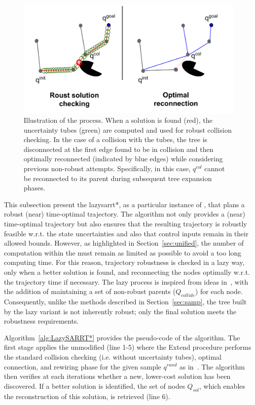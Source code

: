 \begin{figure} [htp]
    \centering
    \includegraphics[width=0.8\linewidth]{figures/samp/lazyrrtstar.png} 
    \caption{Illustration of the  process.
    When a solution is found (red), the uncertainty tubes (green) are computed and used for robust collision checking.
    In the case of a collision with the tubes, the tree is disconnected at the first edge found to be in collision and then optimally reconnected (indicated by blue edges) while considering previous non-robust attempts. 
    Specifically, in this case, $q^{col}$ cannot be reconnected to its parent during subsequent tree expansion phases.
    }%
    \label{fig:lazysarrt*}%
\end{figure}

This subsection present the \gls{lazysarrt*}, as a particular instance of , that plans a robust (near) time-optimal trajectory.
The algorithm not only provides a (near) time-optimal trajectory but also ensures that the resulting trajectory is robustly feasible w.r.t. the state uncertainties and also that control inputs remain in their allowed bounds.
However, as highlighted in Section~\ref{sec:unified}, the number of  computation within the  must remain as limited as possible to avoid a too long computing time. 
For this reason, trajectory robustness is checked in a lazy way, only when a better solution is found, and reconnecting the nodes optimally w.r.t. the trajectory time if necessary.
The lazy process is inspired from ideas in~\cite{cLazy1,cLazy2}, with the addition of maintaining a set of non-robust parents ($Q_{collide}$) for each node.
Consequently, unlike the  methods described in Section~\ref{sec:samp}, the tree built by the lazy variant is not inherently robust; only the final solution meets the robustness requirements.

Algorithm~\ref{alg:LazySARRT*} provides the pseudo-code of the  algorithm.
The first stage applies the unmodified  (line 1-5) where the Extend procedure performs the standard collision checking (i.e. without uncertainty tubes), optimal connection, and rewiring phase for the given sample  $q^{rand}$ as in~\cite{cRRTstar}.
The algorithm then verifies at each iterations whether a new, lower-cost solution has been discovered. 
If a better solution is identified, the set of nodes $Q_{sol}$, which enables the reconstruction of this solution, is retrieved (line 6).


